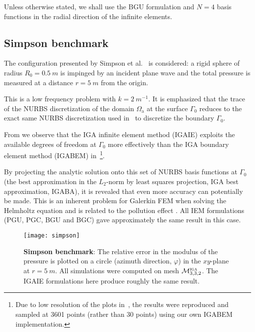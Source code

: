 Unless otherwise stated, we shall use the BGU formulation and $N=4$ basis functions in the radial direction of the infinite elements.

\subsection{Simpson benchmark}
The configuration presented by Simpson et al.~\cite{Simpson2014aib} is considered: a rigid sphere of radius $R_0=\SI{0.5}{m}$ is impinged by an incident plane wave and the total pressure is measured at a distance $r=\SI{5}{m}$ from the origin. 

This is a low frequency problem with $k=\SI{2}{m^{-1}}$. It is emphasized that the trace of the NURBS discretization of the domain $\Omega_{\mathrm{a}}$ at the surface $\Gamma_0$ reduces to the exact same NURBS discretization used in~\cite{Simpson2014aib} to discretize the boundary $\Gamma_0$. 

From  we observe that the IGA infinite element method (IGAIE) exploits the available degrees of freedom at $\Gamma_0$ more effectively than the IGA boundary element method (IGABEM) in~\cite{Simpson2014aib}\footnote{Due to low resolution of the plots in~\cite[Fig. 17]{Simpson2014aib}, the results were reproduced and sampled at 3601 points (rather than 30 points) using our own IGABEM implementation.}. 

By projecting the analytic solution onto this set of NURBS basis functions at $\Gamma_0$ (the best approximation in the $L_2$-norm by least squares projection, IGA best approximation, IGABA), it is revealed that even more accuracy can potentially be made. This is an inherent problem for Galerkin FEM when solving the Helmholtz equation and is related to the pollution effect \cite{Babuska1995agf}. All IEM formulations (PGU, PGC, BGU and BGC) gave approximately the same result in this case.
\begin{figure}
	\centering
	\texttt{[image: simpson]}
	\caption{\textbf{Simpson benchmark}: The relative error in the modulus of the pressure is plotted on a circle (azimuth direction, $\varphi$) in the $xy$-plane at $r=\SI{5}{m}$. All simulations were computed on mesh ${\cal M}_{3,3,2}^{\textsc{iga}}$. The IGAIE formulations here produce roughly the same result.}
	\label{Fig2:simpsonPlot}
\end{figure}

